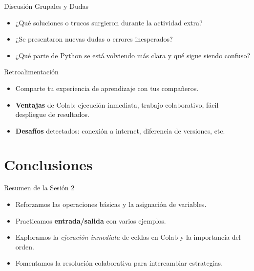 \documentclass[10pt]{beamer}
\begin{document}
\begin{frame}{Discusión Grupales y Dudas}
  \begin{itemize}
    \item ¿Qué soluciones o trucos surgieron durante la actividad extra?
    \item ¿Se presentaron nuevas dudas o errores inesperados?
    \item ¿Qué parte de Python se está volviendo más clara y qué sigue siendo confuso?
  \end{itemize}
\end{frame}

\begin{frame}{Retroalimentación}
  \begin{itemize}
    \item Comparte tu experiencia de aprendizaje con tus compañeros.
    \item \textbf{Ventajas} de Colab: ejecución inmediata, trabajo colaborativo, fácil despliegue de resultados.
    \item \textbf{Desafíos} detectados: conexión a internet, diferencia de versiones, etc.
  \end{itemize}
\end{frame}

\section{Conclusiones}

\begin{frame}{Resumen de la Sesión 2}
  \begin{itemize}
    \item Reforzamos las operaciones básicas y la asignación de variables.
    \item Practicamos \textbf{entrada/salida} con varios ejemplos.
    \item Exploramos la \textit{ejecución inmediata} de celdas en Colab y la importancia del orden.
    \item Fomentamos la resolución colaborativa para intercambiar estrategias.
  \end{itemize}
\end{frame}
\end{document}
